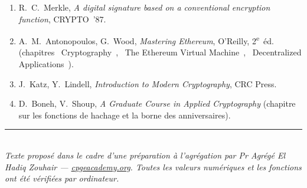 \documentclass[11pt,a4paper]{article}
\theoremstyle{definition}\newtheorem{definition}{Définition}
\theoremstyle{plain}\newtheorem{theoreme}{Théorème}\newtheorem{proposition}{Proposition}\newtheorem{lemme}{Lemme}
\theoremstyle{remark}\newtheorem{remarque}{Remarque}
\begin{document}
\begin{enumerate}[nosep,leftmargin=1.6em]
  \item R.~C.~Merkle, \emph{A digital signature based on a conventional encryption function},
        CRYPTO~'87.
  \item A.~M.~Antonopoulos, G.~Wood, \emph{Mastering Ethereum}, O'Reilly, 2\textsuperscript{e}~éd.
        (chapitres \guillemotleft~Cryptography~\guillemotright, \guillemotleft~The Ethereum Virtual
        Machine~\guillemotright, \guillemotleft~Decentralized Applications~\guillemotright).
  \item J.~Katz, Y.~Lindell, \emph{Introduction to Modern Cryptography}, CRC Press.
  \item D.~Boneh, V.~Shoup, \emph{A Graduate Course in Applied Cryptography} (chapitre sur les
        fonctions de hachage et la borne des anniversaires).
\end{enumerate}

\vfill
\noindent\rule{\linewidth}{0.3pt}\\
{\footnotesize\itshape Texte proposé dans le cadre d'une préparation à l'agrégation par
Pr Agrégé El Hadiq Zouhair --- \href{https://cpgeacademy.org}{cpgeacademy.org}. Toutes les valeurs
numériques et les fonctions ont été vérifiées par ordinateur.}
\end{document}
